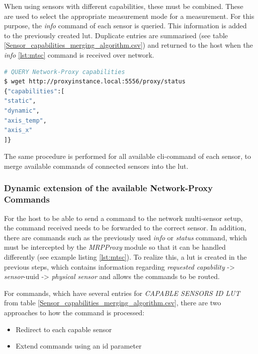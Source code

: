 When using sensors with different capabilities, these must be combined.
These are used to select the appropriate measurement mode for a
measurement. For this purpose, the \emph{info} command of each sensor is
queried. This information is added to the previously created \gls{lut}.
Duplicate entries are summarised (see table
\ref{Sensor_capabilities_merging_algorithm.csv}) and returned to the
host when the \emph{info} \ref{lst:mtsc} command is received over
network.

\begin{lstlisting}[language=bash, caption={MRPProxy REST capabilities query result after executing the merging algorithm}, label=lst:mtsc]
# QUERY Network-Proxy capabilities
$ wget http://proxyinstance.local:5556/proxy/status
{"capabilities":[
"static",
"dynamic",
"axis_temp",
"axis_x"
]}
\end{lstlisting}

The same procedure is performed for all available \gls{cli}-command of
each sensor, to merge available commands of connected sensors into the
\gls{lut}.

\hypertarget{dynamic-extension-of-the-available-network-proxy-commands}{%
\subsubsection{Dynamic extension of the available Network-Proxy
Commands}\label{dynamic-extension-of-the-available-network-proxy-commands}}

For the host to be able to send a command to the network multi-sensor
setup, the command received needs to be forwarded to the correct sensor.
In addition, there are commands such as the previously used \emph{info}
or \emph{status} command, which must be intercepted by the
\emph{MRPProxy} module so that it can be handled differently (see
example listing \ref{lst:mtsc}). To realize this, a \gls{lut} is created
in the previous steps, which contains information regarding
\emph{requested capability} -\textgreater{} \emph{sensor}-\gls{uuid}
-\textgreater{} \emph{physical sensor} and allows the commands to be
routed.

For commands, which have several entries for \emph{CAPABLE SENSORS ID
LUT} from table \ref{Sensor_capabilities_merging_algorithm.csv}, there
are two approaches to how the command is processed:

\begin{itemize}
\tightlist
\item
  Redirect to each capable sensor
\item
  Extend commands using an id parameter
\end{itemize}

